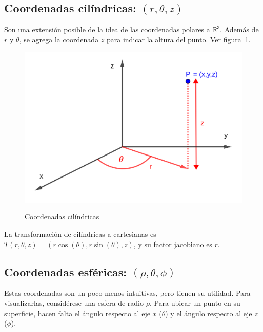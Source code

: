 \documentclass{article}
\renewcommand{\Bbb}{\mathbb}
\begin{document}
\subsection{Coordenadas cilíndricas: \texorpdfstring{$(r, \theta, z)$}{(r, theta, z)}}

Son una extensión posible de la idea de las coordenadas polares a $\Bbb R^3$. Además de $r$ y $\theta$, se agrega la coordenada $z$ para indicar la altura del punto. Ver figura~\ref{fig:ccil}.

\begin{figure}[ht]
\centering
\caption{Coordenadas cilíndricas}
\includegraphics[scale=0.8]{img/teo_fig024_ccil.png}
\label{fig:ccil}
\end{figure}

La transformación de cilíndricas a cartesianas es $T(r, \theta, z) = (r \cos(\theta), r \sin(\theta), z)$, y su factor jacobiano es $r$.

\subsection{Coordenadas esféricas: \texorpdfstring{$(\rho, \theta, \phi)$}{rho, theta, phi}}

Estas coordenadas son un poco menos intuitivas, pero tienen su utilidad. Para visualizarlas, considérese una esfera de radio $\rho$. Para ubicar un punto en su superficie, hacen falta el ángulo respecto al eje $x$ ($\theta$) y el ángulo respecto al eje $z$ ($\phi$).
\end{document}

